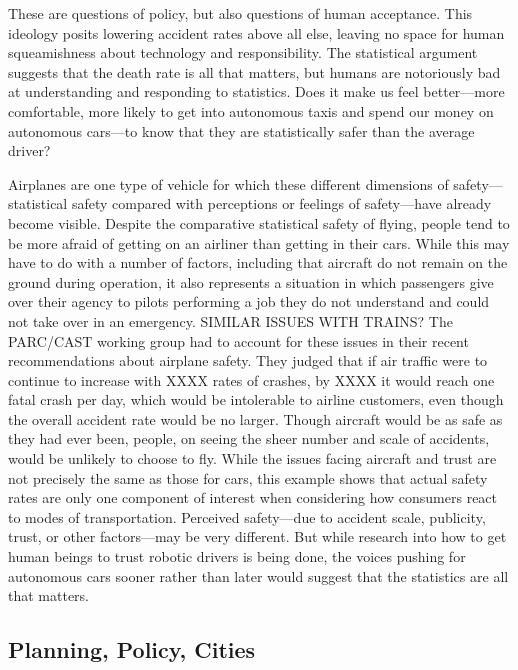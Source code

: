 These are questions of policy, but also questions of human acceptance.
This ideology posits lowering accident rates above all else, leaving
no space for human squeamishness about technology and responsibility. 
The statistical argument suggests that the death rate is all that
matters, but humans are notoriously bad at understanding and
responding to statistics. Does it make us feel better---more
comfortable, more likely to get into autonomous taxis and spend our
money on autonomous cars---to know that they are statistically safer
than the average driver? 

Airplanes are one type of vehicle for which these different dimensions of
safety---statistical safety compared with perceptions or feelings of
safety---have already become visible. Despite the comparative statistical safety of flying,
people tend to be more afraid of getting on an airliner than getting in their
cars.\cite{???} While this may have to do with a number of factors,
including that aircraft do not remain on the ground during operation,
it also represents a situation in which passengers give over their
agency to pilots performing a job they do not understand and could not
take over in an emergency.\cite{???-canIFindAnythingOnThis} SIMILAR
ISSUES WITH TRAINS?\cite{??} The
PARC/CAST working group had to account for these issues in their recent
recommendations about airplane safety. They judged that if air traffic
were to continue to increase with XXXX rates of crashes, by XXXX it
would reach one fatal crash per day, which would be intolerable to
airline customers, even though the overall accident rate would be no
larger.\cite{???-PARCCAST} Though aircraft would be as safe as they
had ever been, people, on seeing the sheer number and scale of
accidents, would be unlikely to choose to fly. While the issues facing
aircraft and trust are not precisely the same as those for cars, this
example shows that actual safety rates are only
one component of interest when considering how consumers react to
modes of transportation. Perceived safety---due to accident scale,
publicity, trust, or other factors---may be very different. But
while research into how to get human beings to trust robotic drivers
is being done\cite{???}, the voices pushing for autonomous cars sooner
rather than later would suggest that the statistics are all that
matters. 


\subsection{Planning, Policy, Cities}



